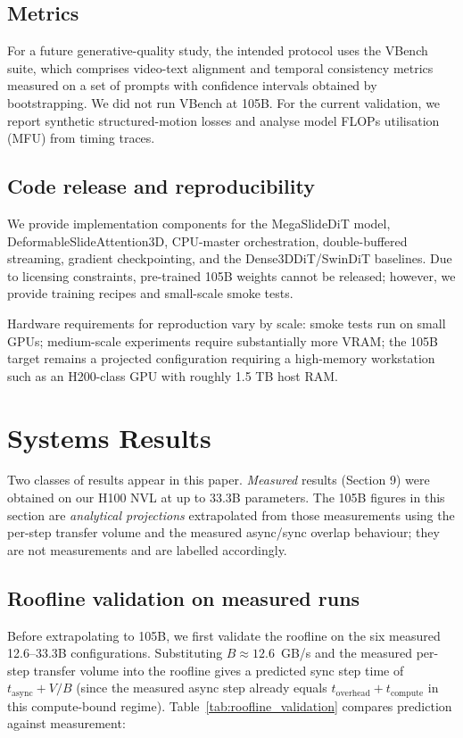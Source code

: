 \documentclass[11pt, letterpaper]{article}
\begin{document}
\subsection{Metrics}
For a future generative-quality study, the intended protocol uses the VBench suite, which comprises video-text alignment and temporal consistency metrics measured on a set of prompts with confidence intervals obtained by bootstrapping. We did not run VBench at 105B. For the current validation, we report synthetic structured-motion losses and analyse model FLOPs utilisation (MFU) from timing traces.

\subsection{Code release and reproducibility}
We provide implementation components for the MegaSlideDiT model, DeformableSlideAttention3D, CPU-master orchestration, double-buffered streaming, gradient checkpointing, and the Dense3DDiT/SwinDiT baselines. Due to licensing constraints, pre-trained 105B weights cannot be released; however, we provide training recipes and small-scale smoke tests.

Hardware requirements for reproduction vary by scale: smoke tests run on small GPUs; medium-scale experiments require substantially more VRAM; the 105B target remains a projected configuration requiring a high-memory workstation such as an H200-class GPU with roughly 1.5 TB host RAM.

\section{Systems Results}

Two classes of results appear in this paper. \emph{Measured} results (Section 9) were obtained on our H100 NVL at up to 33.3B parameters. The 105B figures in this section are \emph{analytical projections} extrapolated from those measurements using the per-step transfer volume and the measured async/sync overlap behaviour; they are not measurements and are labelled accordingly.

\subsection{Roofline validation on measured runs}
Before extrapolating to 105B, we first validate the roofline on the six measured 12.6--33.3B configurations. Substituting $B \approx 12.6$~GB/s and the measured per-step transfer volume into the roofline gives a predicted sync step time of $t_{\text{async}} + V/B$ (since the measured async step already equals $t_{\text{overhead}} + t_{\text{compute}}$ in this compute-bound regime). Table~\ref{tab:roofline_validation} compares prediction against measurement:
\end{document}
